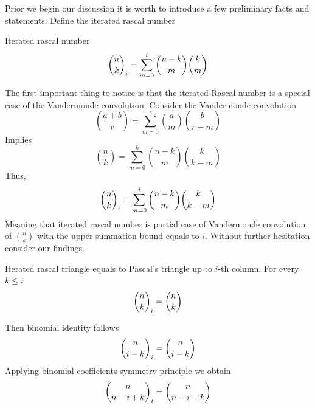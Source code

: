 ﻿Prior we begin our discussion it is worth to introduce a few preliminary facts and statements.
Define the iterated rascal number
\begin{definition}
    Iterated rascal number
    \begin{align}
        \binom{n}{k}_{i} = \sum_{m=0}^{i} \binom{n-k}{m} \binom{k}{m}
    \end{align}
\end{definition}
The first important thing to notice is that the iterated Rascal number is a special case of the Vandermonde convolution.
Consider the Vandermonde convolution~\cite{andrews1999special}
\begin{equation*}
    \binom{a+b}{r} = \sum_{m=0}^{r} \binom{a}{m} \binom{b}{r-m}
\end{equation*}
Implies
\begin{equation*}
    \binom{n}{k} = \sum_{m=0}^{k} \binom{n-k}{m} \binom{k}{k-m}
\end{equation*}
Thus,
\begin{equation}
    \binom{n}{k}_{i} = \sum_{m=0}^{i} \binom{n-k}{m} \binom{k}{k-m}
    \label{eq:rascal-vandermonde-convolution}
\end{equation}
Meaning that iterated rascal number is partial case of Vandermonde convolution of $\binom{n}{k}$
with the upper summation bound equals to $i$.
Without further hesitation consider our findings.
\begin{proposition}
    \label{prop:rascal-binomial-identity-for-i}
    Iterated rascal triangle equals to Pascal's triangle up to $i$-th column.
    For every $k\leq i$
    \begin{equation}
        \binom{n}{k}_{i} = \binom{n}{k}
        \label{eq:rascal-column-identity}
    \end{equation}
\end{proposition}
Then binomial identity follows
\begin{align*}
    \binom{n}{i-k}_{i} = \binom{n}{i-k}
\end{align*}
Applying binomial coefficients symmetry principle we obtain
\begin{align*}
    \binom{n}{n-i+k}_{i} = \binom{n}{n-i+k}
\end{align*}
